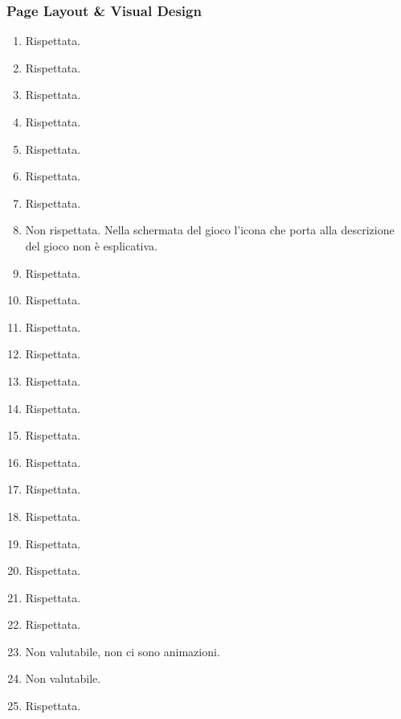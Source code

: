 \documentclass[../Report.tex]{subfiles}
\begin{document}
    \subsubsection{Page Layout \& Visual Design}
    \begin{enumerate}
        \item Rispettata. 
        \item Rispettata.
        \item Rispettata.
        \item Rispettata.
        \item Rispettata.
        \item Rispettata.
        \item Rispettata.
        \item Non rispettata. Nella schermata del gioco l'icona che porta alla descrizione del gioco non è esplicativa.
        \item Rispettata.
        \item Rispettata. 
        \item Rispettata. 
        \item Rispettata.
        \item Rispettata.
        \item Rispettata.
        \item Rispettata.
        \item Rispettata.
        \item Rispettata.
        \item Rispettata.
        \item Rispettata.
        \item Rispettata.
        \item Rispettata.
        \item Rispettata.
        \item Non valutabile, non ci sono animazioni.
        \item Non valutabile.
        \item Rispettata. 
    \end{enumerate}
\end{document}
